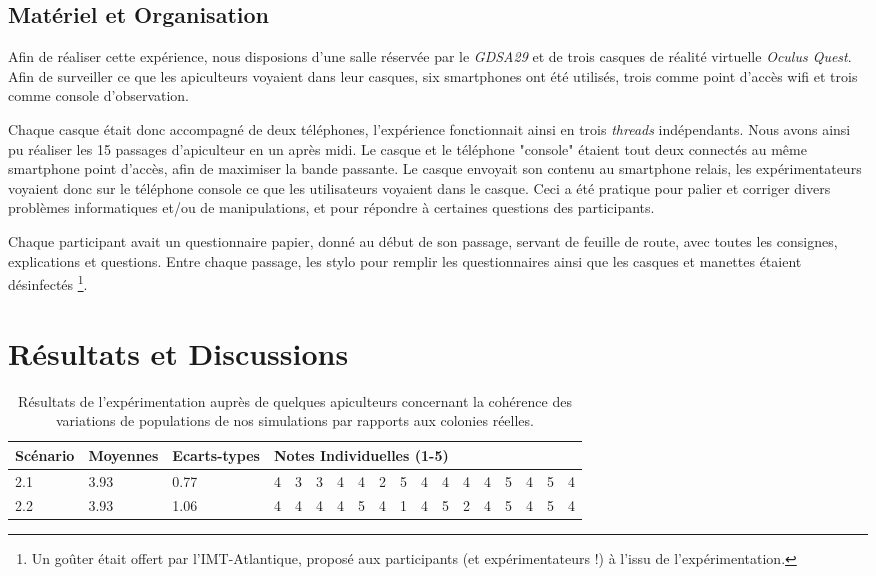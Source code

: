 		
		\subsection{Matériel et Organisation}
		Afin de réaliser cette expérience, nous disposions d'une salle réservée par le \textit{GDSA29} et de trois casques de réalité virtuelle \textit{Oculus Quest}. Afin de surveiller ce que les apiculteurs voyaient dans leur casques, six smartphones ont été utilisés, trois comme point d'accès wifi et trois comme console d'observation.
		
		Chaque casque était donc accompagné de deux téléphones, l'expérience fonctionnait ainsi en trois \textit{threads} indépendants. Nous avons ainsi pu réaliser les 15 passages d'apiculteur en un après midi. Le casque et le téléphone "console" étaient tout deux connectés au même smartphone point d'accès, afin de maximiser la bande passante. Le casque envoyait son contenu au smartphone relais, les expérimentateurs voyaient donc sur le téléphone console ce que les utilisateurs voyaient dans le casque. Ceci a été pratique pour palier et corriger divers problèmes informatiques et/ou de manipulations, et pour répondre à certaines questions des participants.
		
		Chaque participant avait un questionnaire papier, donné au début de son passage, servant de feuille de route, avec toutes les consignes, explications et questions. Entre chaque passage, les stylo pour remplir les questionnaires ainsi que les casques et manettes étaient désinfectés \footnote{Un goûter était offert par l'IMT-Atlantique, proposé aux participants (et expérimentateurs !) à l'issu de l'expérimentation.}. 		
		
		
	\section{Résultats et Discussions}
	
	
	\begin{table}
	\centering
	\begin{tabular}{l|l|l|lllllllllllllll}
	Scénario & Moyennes & Ecarts-types & \multicolumn{15}{l}{Notes Individuelles (1-5)}\\
	\hline
	2.1 & 3.93 & 0.77 &4&3&3&4&4&2&5&4&4&4&4&5&4&5&4\\
	2.2 & 3.93 & 1.06 &4&4&4&4&5&4&1&4&5&2&4&5&4&5&4\\	
	\end{tabular}
	\caption{Résultats de l'expérimentation auprès de quelques apiculteurs concernant la cohérence des variations de populations de nos simulations par rapports aux colonies réelles.}
	\label{TabResCoherence}
	\end{table}
	
